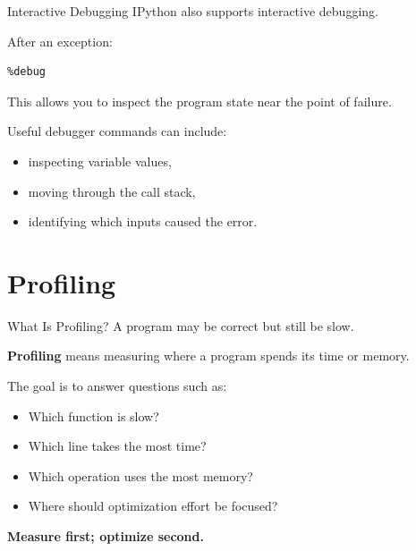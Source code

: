 \documentclass[aspectratio=169]{beamer}
\begin{document}
\begin{frame}[fragile]{Interactive Debugging}
IPython also supports interactive debugging.

After an exception:

\begin{lstlisting}
%debug
\end{lstlisting}

This allows you to inspect the program state near the point of failure.

Useful debugger commands can include:
\begin{itemize}
    \item inspecting variable values,
    \item moving through the call stack,
    \item identifying which inputs caused the error.
\end{itemize}
\end{frame}

\section{Profiling}

\begin{frame}{What Is Profiling?}
A program may be correct but still be slow.

\vspace{0.3cm}

\textbf{Profiling} means measuring where a program spends its time
or memory.

\vspace{0.3cm}

The goal is to answer questions such as:
\begin{itemize}
    \item Which function is slow?
    \item Which line takes the most time?
    \item Which operation uses the most memory?
    \item Where should optimization effort be focused?
\end{itemize}

\vspace{0.3cm}

\textbf{Measure first; optimize second.}
\end{frame}
\end{document}
